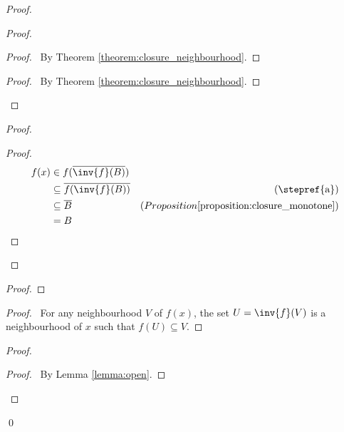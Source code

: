 \begin{proof}
    \pf
    \begin{proof}
        \begin{proof}
            \pf\ By Theorem \ref{theorem:closure_neighbourhood}.
        \end{proof}
        \qedstep
        \begin{proof}
            \pf\ By Theorem \ref{theorem:closure_neighbourhood}.
        \end{proof}
    \end{proof}
    \begin{proof}
        \begin{proof}
            \pf
            \begin{align*}
                f(x) & \in f(\overline{\inv{f}(B)}) \\
                & \subseteq \overline{f(\inv{f}(B))} & (\text{\stepref{a}})\\
                & \subseteq \overline{B} & (Proposition \ref{proposition:closure_monotone}) \\
                & = B
            \end{align*}
        \end{proof}
    \end{proof}
    \begin{proof}
    \end{proof}
    \begin{proof}
        \pf\ For any neighbourhood $V$ of $f(x)$, the set $U = \inv{f}(V)$ is a neighbourhood of $x$ such that
        $f(U) \subseteq V$.
    \end{proof}
    \begin{proof}
        \qedstep
        \begin{proof}
            \pf\ By Lemma \ref{lemma:open}.
        \end{proof}
    \end{proof}
    \qed
\end{proof}

